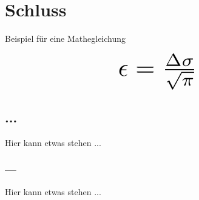 \documentclass[a4paper, 12pt]{article}
\begin{document}
\newpage
\section{Schluss}
Beispiel für eine Mathegleichung

\begin{displaymath}
\scalebox{3}{$\epsilon = \frac{\Delta\sigma}{\sqrt{\pi}}$}
\end{displaymath}

\subsection{...}
Hier kann etwas stehen ...

\subsubsection{---}
Hier kann etwas stehen ...



\end{document}
